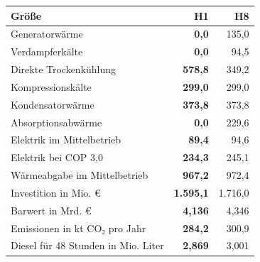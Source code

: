 \begin{tabular*}{\columnwidth}{@{\extracolsep{\fill}}>{\hspace{0pt}\raggedright\arraybackslash}p{39mm}>{\bfseries}rr}
\toprule
Größe & H1 & H8 \\
\midrule
Generatorwärme & 0,0 & 135,0 \\
Verdampferkälte & 0,0 & 94,5 \\
Direkte Trockenkühlung & 578,8 & 349,2 \\
Kompressionskälte & 299,0 & 299,0 \\
Kondensatorwärme & 373,8 & 373,8 \\
Absorptionsabwärme & 0,0 & 229,6 \\
Elektrik im Mittelbetrieb & 89,4 & 94,6 \\
Elektrik bei COP 3,0 & 234,3 & 245,1 \\
Wärmeabgabe im Mittelbetrieb & 967,2 & 972,4 \\
Investition in Mio. € & 1.595,1 & 1.716,0 \\
Barwert in Mrd. € & 4,136 & 4,346 \\
Emissionen in kt CO₂ pro Jahr & 284,2 & 300,9 \\
Diesel für 48 Stunden in Mio. Liter & 2,869 & 3,001 \\
\bottomrule
\end{tabular*}
